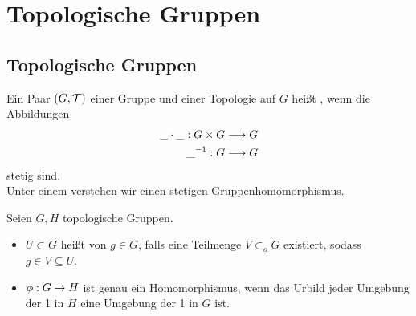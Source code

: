 \documentclass{book}
\renewcommand{\i}{^{-1}}
\begin{document}
\tableofcontents

\chapter{Topologische Gruppen}
\section{Topologische Gruppen}
Ein Paar $(G,\mathcal{T})$ einer Gruppe und einer Topologie auf $G$ heißt , wenn die Abbildungen
\begin{align*}
\_\cdot\_ : G \times G &\Pfeil{} G\\
\_\i : G &\Pfeil{} G
\end{align*}
stetig sind.\\
Unter einem  verstehen wir einen stetigen Gruppenhomomorphismus.

\Bem{}
Seien $G,H$ topologische Gruppen.
\begin{itemize}
\item $U \subset G$ heißt  von $g\in G$, falls eine Teilmenge $V \subset_o G$ existiert, sodass $g \in V \subseteq U$.
\item $\phi: G \overset{}{\rightarrow} H$ ist genau ein Homomorphismus, wenn das Urbild jeder Umgebung der 1 in $H$ eine Umgebung der 1 in $G$ ist.
\end{itemize}
\end{document}
